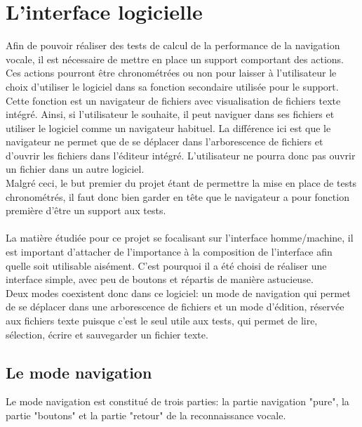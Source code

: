 \documentclass[a4paper, 11pt]{report}
\begin{document}
	\chapter{L'interface logicielle}
	
	
	Afin de pouvoir réaliser des tests de calcul de la performance de la navigation vocale, il est nécessaire de mettre en place un support comportant des actions. Ces actions pourront \^etre chronométrées ou non pour laisser à l'utilisateur le choix d'utiliser le logiciel dans sa fonction secondaire utilisée pour le support. Cette fonction est un navigateur de fichiers avec visualisation de fichiers texte intégré. Ainsi, si l'utilisateur le souhaite, il peut naviguer dans ses fichiers et utiliser le logiciel comme un navigateur habituel. La différence ici est que le navigateur ne permet que de se déplacer dans l'arborescence de fichiers et d'ouvrir les fichiers dans l'éditeur intégré. L'utilisateur ne pourra donc pas ouvrir un fichier dans un autre logiciel. \\
	Malgré ceci, le but premier du projet étant de permettre la mise en place de tests chronométrés, il faut donc bien garder en t\^ete que le navigateur a pour fonction première d'\^etre un support aux tests.\\ \ \\	
	La matière étudiée pour ce projet se focalisant sur l'interface homme/machine, il est important d'attacher de l'importance à la composition de l'interface afin quelle soit utilisable aisément. C'est pourquoi il a été choisi de réaliser une interface simple, avec peu de boutons et répartis de manière astucieuse.\\
	Deux modes coexistent donc dans ce logiciel: un mode de navigation qui permet de se déplacer dans une arborescence de fichiers et un mode d'édition, réservée aux fichiers texte puisque c'est le seul utile aux tests, qui permet de lire, sélection, écrire et sauvegarder un fichier texte.
	
	\section{Le mode navigation}
	
	Le mode navigation est constitué de trois parties: la partie navigation "pure", la partie "boutons" et la partie "retour" de la reconnaissance vocale.\\
	
\end{document}
